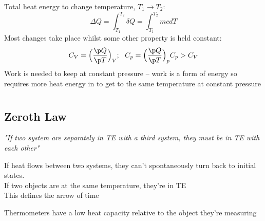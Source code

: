 \documentclass[a4paper, 11pt, normalem]{report}
\begin{document}
Total heat energy to change temperature, $T_1 \to T_2$:
\begin{equation*}
    \Delta Q = \int_{T_{1}}^{T_{2}} \delta Q = \int_{T_1}^{T_2} mcdT
\end{equation*}
Most changes take place whilst some other property is held constant:
\begin{gather*}
    C_{V} = \Big(\frac{\p Q}{\p T}\Big)_{V};~~ C_{p} = \Big(\frac{\p Q}{\p T}\Big)_{p}
    C_{p} > C_{V}
\end{gather*}
Work is needed to keep at constant pressure -- work is a form of energy so requires more heat energy in to get to the same temperature at constant pressure

\chapter{}
\section{Zeroth Law}
\emph{"If two system are separately in TE with a third system, they must be in TE with each other"}

If heat flows between two systems, they can't spontaneously turn back to initial states. \\
If two objects are at the same temperature, they're in TE \\
This defines the arrow of time

Thermometers have a low heat capacity relative to the object they're measuring
\end{document}
